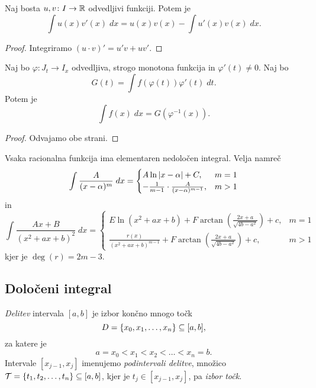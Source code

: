 \documentclass[12pt, a4paper]{article}
\begin{document}
\obvs

\begin{trditev}
Naj bosta $u, v\colon I\to\mathbb{R}$ odvedljivi funkciji. Potem je
\[
\int u(x) v'(x)\;dx = u(x) v(x) - \int u'(x) v(x)\;dx.
\]
\end{trditev}

\begin{proof}
Integriramo $(u\cdot v)'=u'v+uv'$.
\end{proof}

\begin{trditev}
Naj bo $\varphi\colon J_t\to I_x$ odvedljiva, strogo monotona funkcija in $\varphi'(t)\ne 0$. Naj bo
\[
G(t) = \int f(\varphi(t))\varphi'(t)\;dt.
\]
Potem je
\[
\int f(x)\;dx = G(\varphi^{-1}(x)).
\]
\end{trditev}

\begin{proof}
Odvajamo obe strani.
\end{proof}

\begin{opomba}
Vsaka racionalna funkcija ima elementaren nedoločen integral. Velja namreč
\[
\int\frac{A}{(x-\alpha)^m}\;dx=\begin{cases}
A\ln\left\lvert x-\alpha\right\rvert+C, & m=1 \\
-\frac{1}{m-1}\cdot\frac{A}{(x-\alpha)^{m-1}}, & m>1
\end{cases}
\]
in
\[
\int \frac{Ax+B}{(x^2+ax+b)^2}\;dx = \begin{cases}
E\ln(x^2+ax+b)+F\arctan\left(\frac{2x+a}{\sqrt{4b-a^2}}\right)+c, & m=1 \\
\frac{r(x)}{(x^2+ax+b)^{m-1}}+F\arctan\left(\frac{2x+a}{\sqrt{4b-a^2}}\right)+c, & m>1
\end{cases}
\]
kjer je $\deg(r)=2m-3$.
\end{opomba}

\newpage

\subsection{Določeni integral}

\begin{definicija}
\emph{Delitev} intervala $[a,b]$ je izbor končno mnogo točk
\[
D=\left\{x_0,x_1,\dots,x_n\right\}\subseteq[a,b],
\]
za katere je
\[
a=x_0<x_1<x_2<\dots<x_n=b.
\]
Intervale $[x_{j-1},x_j]$ imenujemo \emph{podintervali delitve}, množico $\mathcal{T}=\left\{t_1,t_2,\dots,t_n\right\}\subseteq[a,b]$, kjer je $t_j\in[x_{j-1},x_j]$, pa \emph{izbor točk}.
\end{definicija}
\end{document}
